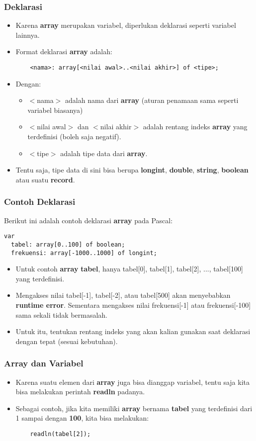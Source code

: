 \documentclass{beamer}
\begin{document}
\begin{frame}[fragile]
\frametitle{Deklarasi}
\begin{itemize}
	\item Karena \textbf{array} merupakan variabel, diperlukan deklarasi seperti variabel lainnya.
	\item Format deklarasi \textbf{array} adalah:
	\begin{lstlisting}
	<nama>: array[<nilai awal>..<nilai akhir>] of <tipe>;
	\end{lstlisting}
	\item Dengan:
	\begin{itemize}
		\item $<$nama$>$ adalah nama dari \textbf{array} (aturan penamaan sama seperti variabel biasanya)
		\item $<$nilai awal$>$ dan $<$nilai akhir$>$ adalah rentang indeks \textbf{array} yang terdefinisi (boleh saja negatif).
		\item $<$tipe$>$ adalah tipe data dari \textbf{array}.
	\end{itemize}
	\item Tentu saja, tipe data di sini bisa berupa \textbf{longint}, \textbf{double}, \textbf{string}, \textbf{boolean} atau suatu \textbf{record}.
\end{itemize}
\end{frame}

\begin{frame}[fragile]
\frametitle{Contoh Deklarasi}
Berikut ini adalah contoh deklarasi \textbf{array} pada Pascal:
\begin{lstlisting}
var
  tabel: array[0..100] of boolean;
  frekuensi: array[-1000..1000] of longint;
\end{lstlisting}
\begin{itemize}
	\item Untuk contoh \textbf{array} \textbf{tabel}, hanya tabel[0], tabel[1], tabel[2], ..., tabel[100] yang terdefinisi.
	\item Mengakses nilai tabel[-1], tabel[-2], atau tabel[500] akan menyebabkan \textbf{runtime error}. Sementara mengakses nilai frekuensi[-1] atau frekuensi[-100] sama sekali tidak bermasalah.
	\item Untuk itu, tentukan rentang indeks yang akan kalian gunakan saat deklarasi dengan tepat (sesuai kebutuhan).
\end{itemize}
\end{frame}

\begin{frame}[fragile]
\frametitle{Array dan Variabel}
\begin{itemize}
	\item Karena suatu elemen dari \textbf{array} juga bisa dianggap variabel, tentu saja kita bisa melakukan perintah \textbf{readln} padanya.
	\item Sebagai contoh, jika kita memiliki \textbf{array} bernama \textbf{tabel} yang terdefinisi dari 1 sampai dengan \textbf{100}, kita bisa melakukan:
	\begin{lstlisting}
	readln(tabel[2]);
	\end{lstlisting}
\end{itemize}
\end{frame}
\end{document}
